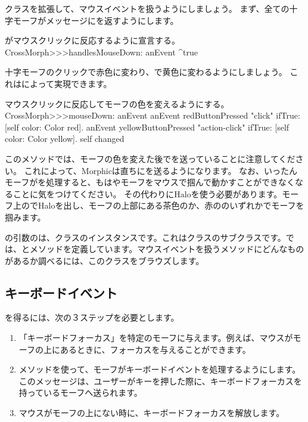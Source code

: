 \documentclass[a4paper,10pt,twoside]{book}
\begin{document}
クラスを拡張して、マウスイベントを扱うようにしましょう。
まず、全ての十字モーフがメッセージにを返すようにします。

\begin{method}{がマウスクリックに反応するように宣言する。}
CrossMorph>>>handlesMouseDown: anEvent
	^true
\end{method}

十字モーフのクリックで赤色に変わり、\actclick で黄色に変わるようにしましょう。
これはによって実現できます。

\begin{method}[mouseDown]{マウスクリックに反応してモーフの色を変えるようにする。}
CrossMorph>>>mouseDown: anEvent
	anEvent redButtonPressed "click"
		ifTrue: [self color: Color red].
	anEvent yellowButtonPressed "action-click"
		ifTrue: [self color: Color yellow].
	self changed
\end{method}

このメソッドでは、モーフの色を変えた後でを送っていることに注意してください。
これによって、Morphicは直ちにを送るようになります。
なお、いったんモーフがを処理すると、もはやモーフをマウスで掴んで動かすことができなくなることに気をつけてください。
その代わりにHaloを使う必要があります。モーフ上の\metaclick でHaloを出し、モーフの上部にある茶色の\moveHandle{}か、赤の\grabHandle{}のいずれかでモーフを掴みます。

の引数のは、\mbox{クラス}のインスタンスです。これはクラスのサブクラスです。では、とメソッドを定義しています。マウスイベントを扱うメソッドにどんなものがあるか調べるには、このクラスをブラウズします。

\subsection{キーボードイベント}

を得るには、次の３ステップを必要とします。
\begin{enumerate}
	\item 「キーボードフォーカス」を特定のモーフに与えます。例えば、マウスがモーフの上にあるときに、フォーカスを与えることができます。
	\item {}メソッドを使って、モーフがキーボードイベントを処理するようにします。このメッセージは、ユーザーがキーを押した際に、キーボードフォーカスを持っているモーフへ送られます。
	\item マウスがモーフの上にない時に、キーボードフォーカスを解放します。
\end{enumerate}
\end{document}
